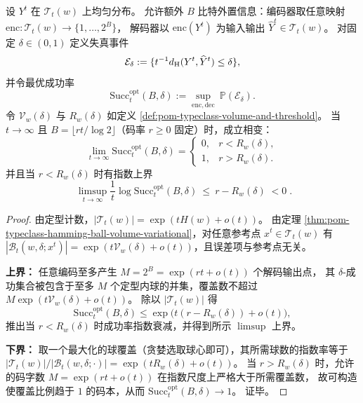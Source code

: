 \begin{theorem}\label{thm:pom-microcanonical-partial-inversion-threshold}
设 \(Y^t\) 在 \(\mathcal T_t(w)\) 上均匀分布。
允许额外 \(B\) 比特外置信息：编码器取任意映射 \(\mathrm{enc}:\mathcal T_t(w)\to\{1,\dots,2^B\}\)，
解码器以 \(\mathrm{enc}(Y^t)\) 为输入输出 \(\widehat Y^t\in\mathcal T_t(w)\)。
对固定 \(\delta\in(0,1)\) 定义失真事件
\[
\mathcal E_\delta:=\{t^{-1}d_{\rm H}(Y^t,\widehat Y^t)\le \delta\},
\]
并令最优成功率
\[
\mathrm{Succ}^{\mathrm{opt}}_t(B,\delta):=\sup_{\mathrm{enc},\mathrm{dec}}\ \mathbb P(\mathcal E_\delta).
\]
令 \(\mathcal V_w(\delta)\) 与 \(R_w(\delta)\) 如定义 \ref{def:pom-typeclass-volume-and-threshold}。
当 \(t\to\infty\) 且 \(B=\lfloor rt/\log 2\rfloor\)（码率 \(r\ge 0\) 固定）时，成立相变：
\[
\boxed{\;
\lim_{t\to\infty}\mathrm{Succ}^{\mathrm{opt}}_t(B,\delta)=
\begin{cases}
0, & r<R_w(\delta),\\
1, & r>R_w(\delta).
\end{cases}\;}
\]
并且当 \(r<R_w(\delta)\) 时有指数上界
\[
\boxed{\;
\limsup_{t\to\infty}\frac{1}{t}\log \mathrm{Succ}^{\mathrm{opt}}_t(B,\delta)\ \le\ r-R_w(\delta)\;<0\; }.
\]
\end{theorem}
\begin{proof}
由定型计数，\(|\mathcal T_t(w)|=\exp(tH(w)+o(t))\)。
由定理 \ref{thm:pom-typeclass-hamming-ball-volume-variational}，对任意参考点 \(x^t\in\mathcal T_t(w)\) 有
\(|\mathcal B_t(w,\delta;x^t)|=\exp(t\mathcal V_w(\delta)+o(t))\)，且误差项与参考点无关。
\par
\textbf{上界：}
任意编码至多产生 \(M=2^B=\exp(rt+o(t))\) 个解码输出点，
其 \(\delta\)-成功集合被包含于至多 \(M\) 个定型内球的并集，覆盖数不超过
\(
M\exp(t\mathcal V_w(\delta)+o(t))
\)。
除以 \(|\mathcal T_t(w)|\) 得
\[
\mathrm{Succ}^{\mathrm{opt}}_t(B,\delta)
\le
\exp\!\bigl(t(r-\!R_w(\delta))+o(t)\bigr),
\]
推出当 \(r<R_w(\delta)\) 时成功率指数衰减，并得到所示 \(\limsup\) 上界。
\par
\textbf{下界：}
取一个最大化的球覆盖（贪婪选取球心即可），其所需球数的指数率等于
\(|\mathcal T_t(w)|/|\mathcal B_t(w,\delta;\cdot)|=\exp(tR_w(\delta)+o(t))\)。
当 \(r>R_w(\delta)\) 时，允许的码字数 \(M=\exp(rt+o(t))\) 在指数尺度上严格大于所需覆盖数，
故可构造使覆盖比例趋于 \(1\) 的码本，从而 \(\mathrm{Succ}^{\mathrm{opt}}_t(B,\delta)\to 1\)。
证毕。
\end{proof}

